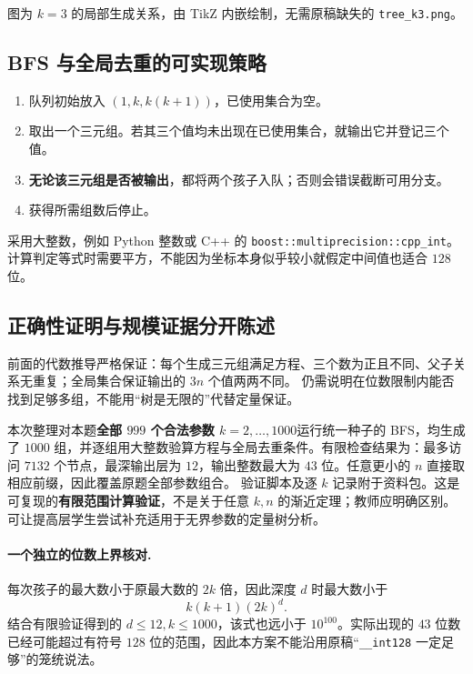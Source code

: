 \documentclass[UTF8,a4paper,11pt,oneside,openany,fontset=fandol]{ctexbook}
\theoremstyle{definition}
\begin{document}
\begin{center}
\end{center}
图为 $k=3$ 的局部生成关系，由 TikZ 内嵌绘制，无需原稿缺失的 \texttt{tree\_k3.png}。

\subsection{BFS 与全局去重的可实现策略}
\begin{enumerate}
\item 队列初始放入 $(1,k,k(k+1))$，已使用集合为空。
\item 取出一个三元组。若其三个值均未出现在已使用集合，就输出它并登记三个值。
\item \textbf{无论该三元组是否被输出}，都将两个孩子入队；否则会错误截断可用分支。
\item 获得所需组数后停止。
\end{enumerate}
采用大整数，例如 Python 整数或 C++ 的 \texttt{boost::multiprecision::cpp\_int}。计算判定等式时需要平方，不能因为坐标本身似乎较小就假定中间值也适合 $128$ 位。

\subsection{正确性证明与规模证据分开陈述}
前面的代数推导严格保证：每个生成三元组满足方程、三个数为正且不同、父子关系无重复；全局集合保证输出的 $3n$ 个值两两不同。
仍需说明在位数限制内能否找到足够多组，不能用“树是无限的”代替定量保证。

本次整理对本题\textbf{全部 $999$ 个合法参数 $k=2,\ldots,1000$}运行统一种子的 BFS，均生成了 $1000$ 组，并逐组用大整数验算方程与全局去重条件。有限检查结果为：最多访问 $7132$ 个节点，最深输出层为 $12$，输出整数最大为 $43$ 位。任意更小的 $n$ 直接取相应前缀，因此覆盖原题全部参数组合。
验证脚本及逐 $k$ 记录附于资料包。这是可复现的\textbf{有限范围计算验证}，不是关于任意 $k,n$ 的渐近定理；教师应明确区别。可让提高层学生尝试补充适用于无界参数的定量树分析。

\paragraph{一个独立的位数上界核对.}
每次孩子的最大数小于原最大数的 $2k$ 倍，因此深度 $d$ 时最大数小于
\[
 k(k+1)(2k)^d.
\]
结合有限验证得到的 $d\le12,k\le1000$，该式也远小于 $10^{100}$。实际出现的 $43$ 位数已经可能超过有符号 $128$ 位的范围，因此本方案不能沿用原稿“\texttt{\_\_int128} 一定足够”的笼统说法。
\end{document}
